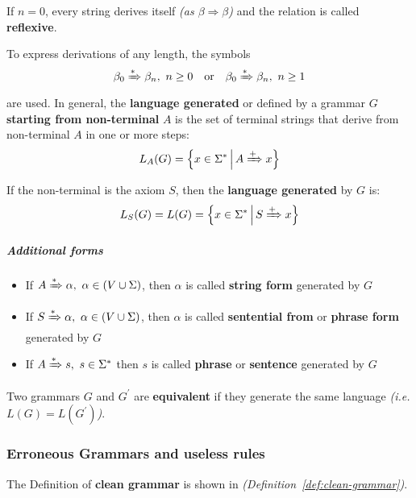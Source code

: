 \documentclass[english]{article}
\begin{document}
If \(n = 0\), every string derives itself \textit{(as \(\beta \Rightarrow \beta\))} and the relation is called \textbf{reflexive}.

To express derivations of any length, the symbols
\[ \beta_0 \xRightarrow{\ast} \beta_n, \ n \geq 0 \quad \text{or} \quad \beta_0 \xRightarrow{\ast} \beta_n, \ n \geq 1 \]
are used.
In general, the \textbf{language generated} or defined by a grammar \(G\) \textbf{starting from non-terminal} \(A\) is the set of terminal strings that derive from non-terminal \(A\) in one or more steps:
\[ L_A(G) = \left\{x \in \Sigma^\ast \, \middle| \, A \xRightarrow{+} x \right\} \]

If the non-terminal is the axiom \(S\), then the \textbf{language generated} by \(G\) is:
\[ L_S(G) = L(G) = \left\{x \in \Sigma^\ast \, \middle| \, S \xRightarrow{+} x \right\} \]

\subparagraph*{Additional forms}

\begin{itemize}
  \item If \(A \xRightarrow{\ast} \alpha, \ \alpha \in (V \cup \Sigma)\), then \(\alpha\) is called \textbf{string form} generated by \(G\)
  \item If \(S \xRightarrow{\ast} \alpha, \ \alpha \in (V \cup \Sigma)\), then \(\alpha\) is called \textbf{sentential from} or \textbf{phrase form} generated by \(G\)
  \item If \(A \xRightarrow{\ast} s, \ s \in \Sigma^\ast\) then \(s\) is called \textbf{phrase} or \textbf{sentence} generated by \(G\)
\end{itemize}

\begin{property}
  Two grammars \(G\) and \(G^\prime\) are \textbf{equivalent} if they generate the same language \textit{(i.e. \(L(G) = L(G^\prime)\))}.
\end{property}

\subsubsection{Erroneous Grammars and useless rules}

The Definition of \textbf{clean grammar} is shown in \textit{(Definition~\ref{def:clean-grammar})}.
\end{document}
